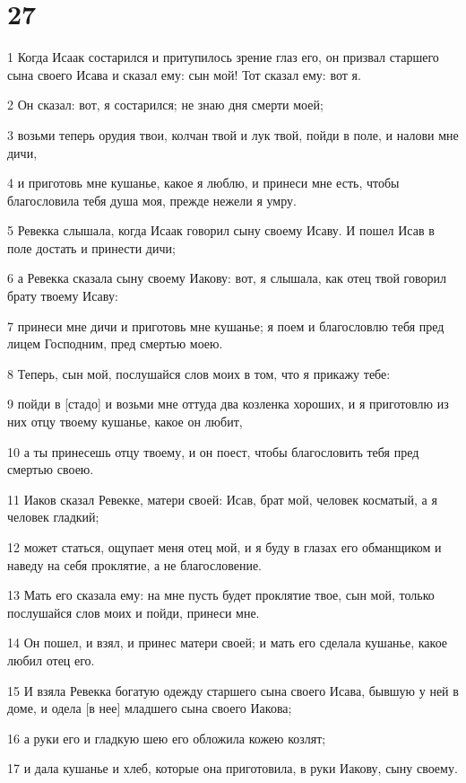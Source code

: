 \chapter{27}

\par 1 Когда Исаак состарился и притупилось зрение глаз его, он призвал старшего сына своего Исава и сказал ему: сын мой! Тот сказал ему: вот я.
\par 2 Он сказал: вот, я состарился; не знаю дня смерти моей;
\par 3 возьми теперь орудия твои, колчан твой и лук твой, пойди в поле, и налови мне дичи,
\par 4 и приготовь мне кушанье, какое я люблю, и принеси мне есть, чтобы благословила тебя душа моя, прежде нежели я умру.
\par 5 Ревекка слышала, когда Исаак говорил сыну своему Исаву. И пошел Исав в поле достать и принести дичи;
\par 6 а Ревекка сказала сыну своему Иакову: вот, я слышала, как отец твой говорил брату твоему Исаву:
\par 7 принеси мне дичи и приготовь мне кушанье; я поем и благословлю тебя пред лицем Господним, пред смертью моею.
\par 8 Теперь, сын мой, послушайся слов моих в том, что я прикажу тебе:
\par 9 пойди в [стадо] и возьми мне оттуда два козленка хороших, и я приготовлю из них отцу твоему кушанье, какое он любит,
\par 10 а ты принесешь отцу твоему, и он поест, чтобы благословить тебя пред смертью своею.
\par 11 Иаков сказал Ревекке, матери своей: Исав, брат мой, человек косматый, а я человек гладкий;
\par 12 может статься, ощупает меня отец мой, и я буду в глазах его обманщиком и наведу на себя проклятие, а не благословение.
\par 13 Мать его сказала ему: на мне пусть будет проклятие твое, сын мой, только послушайся слов моих и пойди, принеси мне.
\par 14 Он пошел, и взял, и принес матери своей; и мать его сделала кушанье, какое любил отец его.
\par 15 И взяла Ревекка богатую одежду старшего сына своего Исава, бывшую у ней в доме, и одела [в нее] младшего сына своего Иакова;
\par 16 а руки его и гладкую шею его обложила кожею козлят;
\par 17 и дала кушанье и хлеб, которые она приготовила, в руки Иакову, сыну своему.

